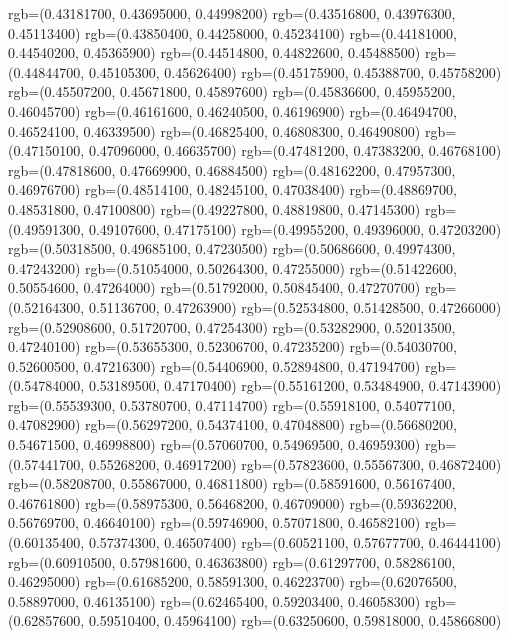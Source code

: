 {{      rgb=(0.43181700, 0.43695000, 0.44998200)
      rgb=(0.43516800, 0.43976300, 0.45113400)
      rgb=(0.43850400, 0.44258000, 0.45234100)
      rgb=(0.44181000, 0.44540200, 0.45365900)
      rgb=(0.44514800, 0.44822600, 0.45488500)
      rgb=(0.44844700, 0.45105300, 0.45626400)
      rgb=(0.45175900, 0.45388700, 0.45758200)
      rgb=(0.45507200, 0.45671800, 0.45897600)
      rgb=(0.45836600, 0.45955200, 0.46045700)
      rgb=(0.46161600, 0.46240500, 0.46196900)
      rgb=(0.46494700, 0.46524100, 0.46339500)
      rgb=(0.46825400, 0.46808300, 0.46490800)
      rgb=(0.47150100, 0.47096000, 0.46635700)
      rgb=(0.47481200, 0.47383200, 0.46768100)
      rgb=(0.47818600, 0.47669900, 0.46884500)
      rgb=(0.48162200, 0.47957300, 0.46976700)
      rgb=(0.48514100, 0.48245100, 0.47038400)
      rgb=(0.48869700, 0.48531800, 0.47100800)
      rgb=(0.49227800, 0.48819800, 0.47145300)
      rgb=(0.49591300, 0.49107600, 0.47175100)
      rgb=(0.49955200, 0.49396000, 0.47203200)
      rgb=(0.50318500, 0.49685100, 0.47230500)
      rgb=(0.50686600, 0.49974300, 0.47243200)
      rgb=(0.51054000, 0.50264300, 0.47255000)
      rgb=(0.51422600, 0.50554600, 0.47264000)
      rgb=(0.51792000, 0.50845400, 0.47270700)
      rgb=(0.52164300, 0.51136700, 0.47263900)
      rgb=(0.52534800, 0.51428500, 0.47266000)
      rgb=(0.52908600, 0.51720700, 0.47254300)
      rgb=(0.53282900, 0.52013500, 0.47240100)
      rgb=(0.53655300, 0.52306700, 0.47235200)
      rgb=(0.54030700, 0.52600500, 0.47216300)
      rgb=(0.54406900, 0.52894800, 0.47194700)
      rgb=(0.54784000, 0.53189500, 0.47170400)
      rgb=(0.55161200, 0.53484900, 0.47143900)
      rgb=(0.55539300, 0.53780700, 0.47114700)
      rgb=(0.55918100, 0.54077100, 0.47082900)
      rgb=(0.56297200, 0.54374100, 0.47048800)
      rgb=(0.56680200, 0.54671500, 0.46998800)
      rgb=(0.57060700, 0.54969500, 0.46959300)
      rgb=(0.57441700, 0.55268200, 0.46917200)
      rgb=(0.57823600, 0.55567300, 0.46872400)
      rgb=(0.58208700, 0.55867000, 0.46811800)
      rgb=(0.58591600, 0.56167400, 0.46761800)
      rgb=(0.58975300, 0.56468200, 0.46709000)
      rgb=(0.59362200, 0.56769700, 0.46640100)
      rgb=(0.59746900, 0.57071800, 0.46582100)
      rgb=(0.60135400, 0.57374300, 0.46507400)
      rgb=(0.60521100, 0.57677700, 0.46444100)
      rgb=(0.60910500, 0.57981600, 0.46363800)
      rgb=(0.61297700, 0.58286100, 0.46295000)
      rgb=(0.61685200, 0.58591300, 0.46223700)
      rgb=(0.62076500, 0.58897000, 0.46135100)
      rgb=(0.62465400, 0.59203400, 0.46058300)
      rgb=(0.62857600, 0.59510400, 0.45964100)
      rgb=(0.63250600, 0.59818000, 0.45866800)
}}
